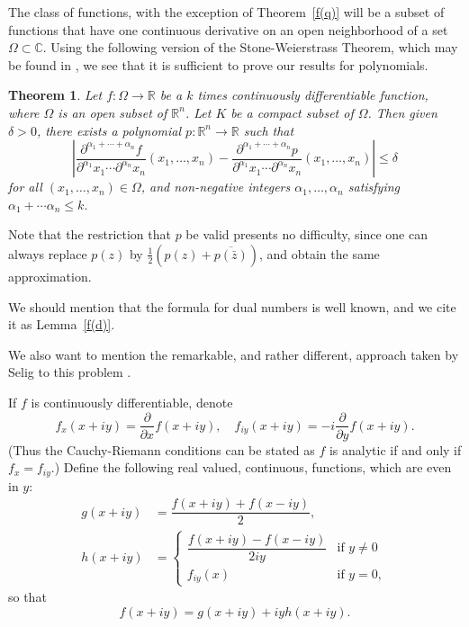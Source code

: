 \documentclass[12pt,reqno]{amsart}
\newtheorem{theorem}{Theorem}
\begin{document}
The class of functions, with the exception of Theorem~\ref{f(q)} will be a subset of functions that have one continuous derivative on an open neighborhood of a set $\Omega \subset \mathbb C$.  Using the following version of the Stone-Weierstrass Theorem, which may be found in \cite[Section 1.6.2]{narasimhan}, we see that it is sufficient to prove our results for polynomials.

\begin{theorem}  Let $f:\Omega \to \mathbb R$ be a $k$ times continuously differentiable function, where $\Omega$ is an open subset of $\mathbb R^n$.  Let $K$ be a compact subset of $\Omega$.  Then given $\delta > 0$, there exists a polynomial $p:\mathbb R^n \to \mathbb R$ such that
\begin{equation}
\left|\frac{\partial^{\alpha_1 + \cdots + \alpha_n} f}{\partial^{\alpha_1} x_1 \cdots \partial^{\alpha_n} x_n}(x_1,\dots,x_n) - \frac{\partial^{\alpha_1 + \cdots + \alpha_n} p}{\partial^{\alpha_1} x_1 \cdots \partial^{\alpha_n} x_n}(x_1,\dots,x_n) \right| \le \delta
\end{equation}
for all $(x_1,\dots,x_n) \in \Omega$, and non-negative integers $\alpha_1, \dots, \alpha_n$ satisfying $\alpha_1 + \cdots \alpha_n \le k$.
\end{theorem}

Note that the restriction that $p$ be valid presents no difficulty, since one can always replace $p(z)$ by $\frac12(p(z) + \overline{p(\bar z)})$, and obtain the same approximation.

We should mention that the formula for dual numbers is well known, and we cite it as Lemma~\ref{f(d)}.

We also want to mention the remarkable, and rather different, approach taken by Selig  to this problem \cite{selig}.

\bigskip

If $f$ is continuously differentiable, denote
\begin{equation}
f_x(x+iy) = \dfrac{\partial}{\partial x} f(x+iy) , \quad
f_{iy}(x+iy) = -i\dfrac{\partial}{\partial y} f(x+iy) .
\end{equation}
(Thus the Cauchy-Riemann conditions can be stated as $f$ is analytic if and only if $f_x = f_{iy}$.)  Define the following real valued, continuous, functions, which are even in $y$:
\begin{align}
\label{g}
g(x+iy) &= \dfrac{f(x+iy) + f(x-iy)} 2, \\
\label{h}
h(x+iy) &= \begin{cases}
\dfrac{f(x+iy)-f(x-iy)}{2iy} &\text{if $y \ne 0$} \\
f_{iy} (x) &\text{if $y = 0$} ,
\end{cases}
\end{align}
so that
\begin{equation}
f(x+iy) = g(x+iy) + i y h(x+iy) .
\end{equation}
\end{document}
